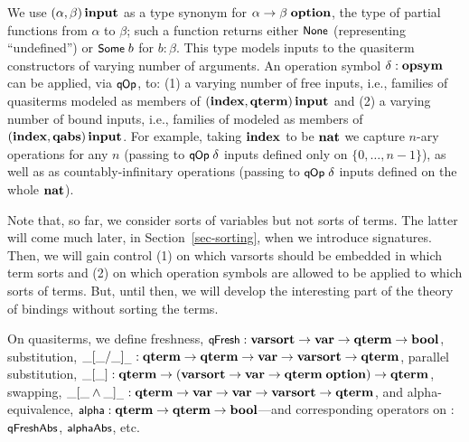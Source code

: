 \documentclass{llncs}
\begin{document}
We use $(\alpha,\beta)\,\mbox{\bf input}$ as a type synonym for $\alpha \rightarrow \beta\;\mbox{\bf option}$, 
the type of partial functions from $\alpha$ to $\beta$; such a function returns either 
$\mbox{\rm\textsf{\small None}}$ (representing ``undefined'') or $\mbox{\rm\textsf{\small Some}}\;b$ for $b : \beta$. This type models 
inputs to the quasiterm constructors of varying number of arguments. An operation symbol 
$\delta : \mbox{\bf opsym}$ can be applied, via $\mbox{\rm\textsf{\small q\hspace*{-0.1ex}Op}}$, to:
%
(1) a varying number of free inputs, i.e., 
families of quasiterms modeled as members of $(\mbox{\bf index},\mbox{\bf qterm})\,\mbox{\bf input}$
and 
(2) a varying number of bound inputs, i.e., 
families of \abstractions{} modeled as members of $(\mbox{\bf index},\mbox{\bf qabs})\,\mbox{\bf input}$.
%
%
For example, taking $\mbox{\bf index}$ to be $\mbox{\bf nat}$ we capture $n$-ary operations 
for any %
$n$ (passing to $\mbox{\rm\textsf{\small q\hspace*{-0.1ex}Op}}\;\delta$ inputs   
defined only on $\{0,\ldots,n-1\}$), as well as as countably-infinitary operations 
(passing to $\mbox{\rm\textsf{\small q\hspace*{-0.1ex}Op}}\;\delta$ inputs defined on the whole $\mbox{\bf nat}$). 

Note that, so far, we consider sorts of variables but not sorts of terms. 
The latter will come much later, in Section~\ref{sec-sorting}, when we introduce signatures. 
Then, we will gain 
control %
(1) on which varsorts 
should be embedded in which term sorts and 
(2) on which operation symbols are allowed to be applied to which sorts 
of terms. %
But, until then, we will develop the interesting part of the theory of bindings without sorting the terms.






On quasiterms, we define 
freshness, $\mbox{\rm\textsf{\small q\hspace*{-0.1ex}Fresh}} : \mbox{\bf varsort} \rightarrow \mbox{\bf var} \rightarrow \mbox{\bf qterm} \rightarrow \mbox{\bf bool}$, 
substitution, $\_[\_ / \_]_{\_} : \mbox{\bf qterm} \rightarrow \mbox{\bf qterm} \rightarrow \mbox{\bf var} \rightarrow \mbox{\bf varsort} \rightarrow \mbox{\bf qterm}$, 
parallel substitution, $\_[\_] : \mbox{\bf qterm} \rightarrow (\mbox{\bf varsort} \rightarrow \mbox{\bf var} \rightarrow \mbox{\bf qterm}\;\mbox{\bf option}) \rightarrow \mbox{\bf qterm}$, 
swapping, $\_[\_ \wedge \_]_{\_} : \mbox{\bf qterm} \allowbreak\rightarrow \mbox{\bf var} \rightarrow \mbox{\bf var} \rightarrow \mbox{\bf varsort} \rightarrow \mbox{\bf qterm}$, and alpha-equivalence, 
$\mbox{\rm\textsf{\small alpha}} : \mbox{\bf qterm} \rightarrow \mbox{\bf qterm} \rightarrow \mbox{\bf bool}$---and corresponding operators on \abstractions{}: $\mbox{\rm\textsf{\small qFreshAbs}}$, 
$\mbox{\rm\textsf{\small alphaAbs}}$, etc. 
\end{document}
